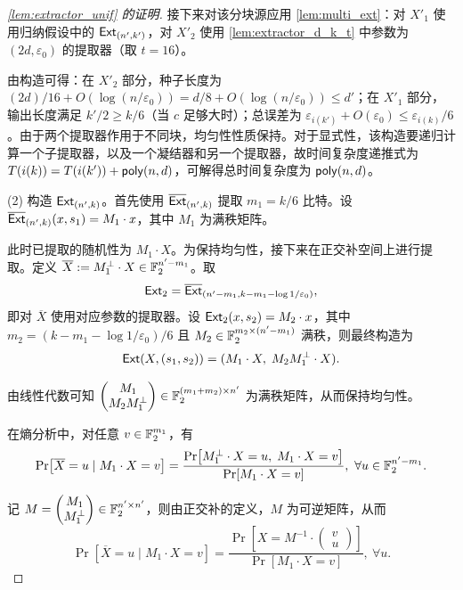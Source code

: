 \begin{proof}[\cref{lem:extractor_unif} 的证明]
    接下来对该分块源应用 \cref{lem:multi_ext}：对 $X'_1$ 使用归纳假设中的 $\mathsf{Ext}_{(n', k')}$，对 $X'_2$ 使用 \cref{lem:extractor_d_k_t} 中参数为 $(2d, \varepsilon_0)$ 的提取器（取 $t=16$）。

    由构造可得：在 $X'_2$ 部分，种子长度为 $(2d)/16 + O(\log(n/\varepsilon_0)) = d / 8 + O(\log (n / \varepsilon_0)) \le d'$；在 $X'_1$ 部分，输出长度满足 $k'/2 \ge k/6$（当 $c$ 足够大时）；总误差为 $\varepsilon_{i(k')} + O(\varepsilon_0) \le \varepsilon_{i(k)}/6$。由于两个提取器作用于不同块，均匀性性质保持。对于显式性，该构造要递归计算一个子提取器，以及一个凝结器和另一个提取器，故时间复杂度递推式为 $T(i(k)) = T(i(k')) + \mathsf{poly}(n, d)$，可解得总时间复杂度为 $\mathsf{poly}(n, d)$。

    (2) 构造 $\mathsf{Ext}_{(n', k)}$。首先使用 $\overline{\mathsf{Ext}}_{(n', k)}$ 提取 $m_1 = k/6$ 比特。设 $\overline{\mathsf{Ext}}_{(n', k)}(x, s_1) = M_1 \cdot x$，其中 $M_1$ 为满秩矩阵。

    此时已提取的随机性为 $M_1 \cdot X$。为保持均匀性，接下来在正交补空间上进行提取。定义 $\overline{X} := M_1^\bot \cdot X \in \mathbb{F}_2^{n' - m_1}$。取
    $$
    \mathsf{Ext}_2 = \overline{\mathsf{Ext}}_{(n' - m_1, k - m_1 - \log 1 / \varepsilon_0)},
    $$
    即对 $\overline{X}$ 使用对应参数的提取器。设 $\mathsf{Ext}_2(x, s_2) = M_2 \cdot x$，其中 $m_2 = (k - m_1 - \log 1 / \varepsilon_0) / 6$ 且 $M_2 \in \mathbb{F}_2^{m_2 \times (n' - m_1)}$ 满秩，则最终构造为
    $$
    \mathsf{Ext}(X, (s_1, s_2)) = (M_1 \cdot X,\; M_2 M_1^\bot \cdot X).
    $$

    由线性代数可知 $\begin{pmatrix} M_1 \\ M_2 M_1^\bot \end{pmatrix} \in \mathbb{F}_2^{(m_1 + m_2) \times n'}$ 为满秩矩阵，从而保持均匀性。

    在熵分析中，对任意 $v \in \mathbb{F}_2^{m_1}$，有
    $$
    \Pr[\overline{X} = u \mid M_1 \cdot X = v]
    = \frac{\Pr[M_1^\bot \cdot X = u,\; M_1 \cdot X = v]}{\Pr[M_1 \cdot X = v]},\ \forall u \in \mathbb{F}_2^{n' - m_1}.
    $$

    记 $M = \begin{pmatrix} M_1 \\ M_1^\bot \end{pmatrix} \in \mathbb{F}_2^{n' \times n'}$，则由正交补的定义，$M$ 为可逆矩阵，从而
    $$
    \Pr[\overline{X} = u \mid M_1 \cdot X = v]
    = \frac{\Pr\left[X = M^{-1} \cdot \begin{pmatrix} v \\ u \end{pmatrix}\right]}{\Pr[M_1 \cdot X = v]},\ \forall u.
    $$


\end{proof}
